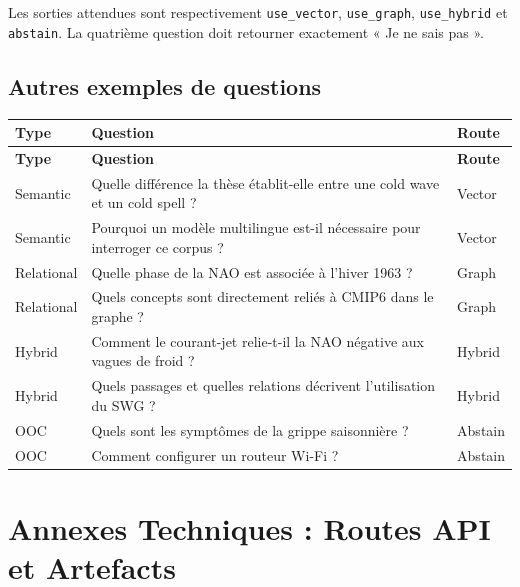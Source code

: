 \documentclass[12pt,a4paper,oneside]{report}
\newcommand{\tech}[1]{\texttt{#1}}
\begin{document}
\begin{appendices}
Les sorties attendues sont respectivement \tech{use\_vector}, \tech{use\_graph}, \tech{use\_hybrid} et \tech{abstain}. La quatrième question doit retourner exactement « Je ne sais pas ».

\section{Autres exemples de questions}
\begin{longtable}{p{}p{}p{}}
\toprule
\textbf{Type} & \textbf{Question} & \textbf{Route}\\
\midrule
\endfirsthead
\toprule
\textbf{Type} & \textbf{Question} & \textbf{Route}\\
\midrule
\endhead
Semantic & Quelle différence la thèse établit-elle entre une cold wave et un cold spell ? & Vector\\
Semantic & Pourquoi un modèle multilingue est-il nécessaire pour interroger ce corpus ? & Vector\\
Relational & Quelle phase de la NAO est associée à l'hiver 1963 ? & Graph\\
Relational & Quels concepts sont directement reliés à CMIP6 dans le graphe ? & Graph\\
Hybrid & Comment le courant-jet relie-t-il la NAO négative aux vagues de froid ? & Hybrid\\
Hybrid & Quels passages et quelles relations décrivent l'utilisation du SWG ? & Hybrid\\
OOC & Quels sont les symptômes de la grippe saisonnière ? & Abstain\\
OOC & Comment configurer un routeur Wi-Fi ? & Abstain\\
\bottomrule
\end{longtable}

\chapter{Annexes Techniques : Routes API et Artefacts}

\end{appendices}
\end{document}
